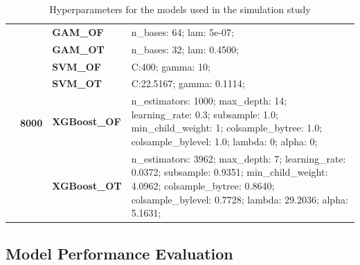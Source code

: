 \documentclass[runningheads]{llncs}
\begin{document}
\begin{table}
\begin{tabularx}{\textwidth}{>{\RaggedRight\arraybackslash}m{1.6cm}p{1.225cm}p{2.05cm}>{\RaggedRight\arraybackslash}X}
        \cline{2-4}
        \textbf{}                               & \multirow[t]{7}{*}{\textbf{8000}} & \textbf{GAM\_OF}     & n\_bases: 64; lam: 5e-07;                                                                                                                                                                         \\
        \textbf{}                               & \textbf{}                         & \textbf{GAM\_OT}     & n\_bases: 32; lam: 0.4500;                                                                                                                                                                        \\
        \textbf{}                               & \textbf{}                         & \textbf{SVM\_OF}     & C:\@400; gamma: 10;                                                                                                                                                                               \\
        \textbf{}                               & \textbf{}                         & \textbf{SVM\_OT}     & C:\@22.5167; gamma: 0.1114;                                                                                                                                                                       \\
        \textbf{}                               & \textbf{}                         & \textbf{XGBoost\_OF} & n\_estimators: 1000; max\_depth: 14; learning\_rate: 0.3; subsample: 1.0; min\_child\_weight: 1; colsample\_bytree: 1.0; colsample\_bylevel: 1.0; lambda: 0; alpha: 0;                            \\
        \textbf{}                               & \textbf{}                         & \textbf{XGBoost\_OT} & n\_estimators: 3962; max\_depth: 7; learning\_rate: 0.0372; subsample: 0.9351; min\_child\_weight: 4.0962; colsample\_bytree: 0.8640; colsample\_bylevel: 0.7728; lambda: 29.2036; alpha: 5.1631; \\
        \bottomrule
    \end{tabularx}
    \caption{Hyperparameters for the models used in the simulation study}
    \label{tab:model-hyperparameters}  %
\end{table}

\subsection{Model Performance Evaluation}
\end{document}
